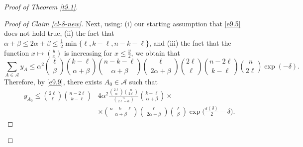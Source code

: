 \documentclass[10pt,a4paper]{amsart}
\theoremstyle{remark}
\newcommand{\mik}{\leqslant}
\newcommand{\Acal}{\mathcal{A}}
\begin{document}
\begin{proof}[Proof of Theorem \emph{\ref{t9.1}}]
\begin{proof}[Proof of Claim \emph{\ref{cl-8-new}}]
Next, using: (i) our starting assumption that \eqref{e9.5} does not hold true,
(ii) the fact that $\alpha+\beta\mik 2\alpha+\beta\mik {}\min\{\ell,k-\ell,n-k-\ell\}$, and
(iii) the fact that the function $x\mapsto {}$ is increasing for $x\mik {}$,
we obtain that
\begin{equation} \label{en.9.2}
\sum_{A\in\Acal}y_{A}\mik \alpha^2\binom{\ell}{\beta}\binom{k-\ell}{\alpha+\beta}
\binom{n-k-\ell}{\alpha+\beta}\binom{\ell}{2\alpha+\beta}
\binom{2\ell}{\ell}\binom{n-2\ell}{k-\ell}\binom{n}{2\ell}\exp(-\delta).
\end{equation}
Therefore, by \eqref{e9.9}, there exists $A_0\in\Acal$ such that
\begin{align} \label{en9.3}
y_{A_0} \mik \binom{2\ell}{\ell}\binom{n-2\ell}{k-\ell} & 4\alpha^2
\frac{\binom{2\ell}{\alpha}\binom{n}{2\ell}}{\binom{n}{2\ell-\alpha}}
\binom{k-\ell}{\alpha+\beta} \times \\
& \times \binom{n-k-\ell}{\alpha+\beta}
\binom{\ell}{2\alpha+\beta}\binom{\ell}{\beta}\exp\Big(\frac{\varepsilon(\delta)}{2}-\delta\Big). \nonumber
\end{align}


\end{proof}
\end{proof}
\end{document}
